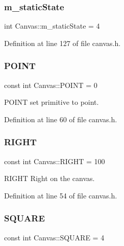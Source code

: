 \subsubsection{\texorpdfstring{m\+\_\+static\+State}{m\_staticState}}
{\footnotesize\ttfamily int Canvas\+::m\+\_\+static\+State = 4\hspace{0.3cm}{\ttfamily [private]}}



Definition at line 127 of file canvas.\+h.

\mbox{\label{class_canvas_a04b852dd0b2561a20a5e0e9f67a95b64}} 
\subsubsection{\texorpdfstring{P\+O\+I\+NT}{POINT}}
{\footnotesize\ttfamily const int Canvas\+::\+P\+O\+I\+NT = 0\hspace{0.3cm}{\ttfamily [static]}}



P\+O\+I\+NT set primitive to point. 



Definition at line 60 of file canvas.\+h.

\mbox{\label{class_canvas_ab618bb921e1c0ee7c394fe3a83b17271}} 
\subsubsection{\texorpdfstring{R\+I\+G\+HT}{RIGHT}}
{\footnotesize\ttfamily const int Canvas\+::\+R\+I\+G\+HT = 100\hspace{0.3cm}{\ttfamily [static]}}



R\+I\+G\+HT Right on the canvas. 



Definition at line 54 of file canvas.\+h.

\mbox{\label{class_canvas_a2d0245c75d7fc30adb8abd303844c10f}} 
\subsubsection{\texorpdfstring{S\+Q\+U\+A\+RE}{SQUARE}}
{\footnotesize\ttfamily const int Canvas\+::\+S\+Q\+U\+A\+RE = 4\hspace{0.3cm}{\ttfamily [static]}}



